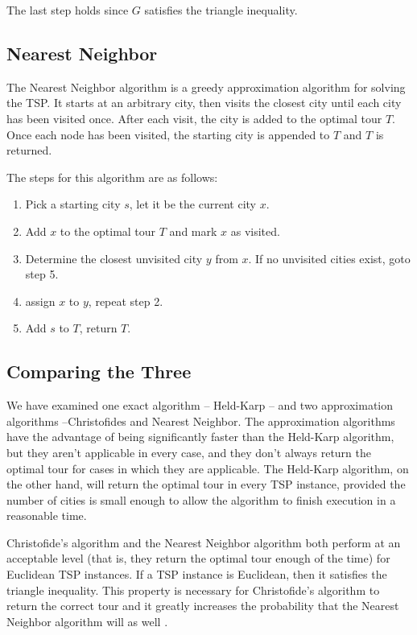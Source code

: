 \documentclass[11pt,fleqn]{article}
\begin{document}
The last step holds since $G$ satisfies the triangle inequality.

\subsection{Nearest Neighbor}
The Nearest Neighbor algorithm is a greedy approximation algorithm
for solving the TSP\@.  It starts at an arbitrary city, then visits
the closest city until each city has been visited once.  After each
visit, the city is added to the optimal tour $T$.  Once each node
has been visited, the starting city is appended to $T$ and $T$ is
returned. \cite{bellmore}
\par

The steps for this algorithm are as follows:
\begin{enumerate}
  \item Pick a starting city $s$, let it be the current city $x$.
  \item Add $x$ to the optimal tour $T$ and mark $x$ as visited.
  \item Determine the closest unvisited city $y$ from $x$.  If no
    unvisited cities exist, goto step 5.
  \item assign $x$ to $y$, repeat step 2.
  \item Add $s$ to $T$, return $T$.
\end{enumerate}

\subsection{Comparing the Three}
We have examined one exact algorithm -- Held-Karp -- and two approximation
algorithms --Christofides and Nearest Neighbor.  The approximation algorithms
have the advantage of being significantly faster than the Held-Karp algorithm,
but they aren't applicable in every case, and they don't always return the optimal
tour for cases in which they are applicable.  The Held-Karp algorithm, on the other
hand, will return the optimal tour in every TSP instance, provided the number of
cities is small enough to allow the algorithm to finish execution in a reasonable
time.
\par

Christofide's algorithm and the Nearest Neighbor algorithm both perform at an
acceptable level (that is, they return the optimal tour enough of the time) for
Euclidean TSP instances.  If a TSP instance is Euclidean, then it satisfies the
triangle inequality.  This property is necessary for Christofide's algorithm to
return the correct tour \cite{nicos} and it greatly increases the probability
that the Nearest Neighbor algorithm will as well \cite{gutin}.
\par
\end{document}

